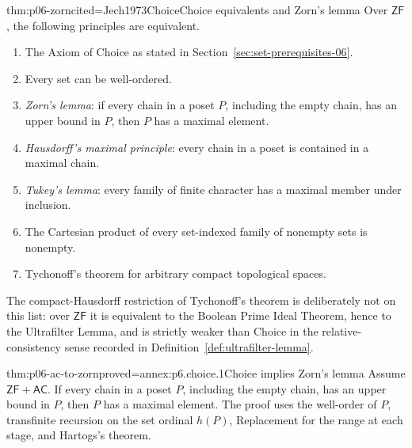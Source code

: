\begin{hbtheorem}{thm:p06-zorn}{cited=Jech1973Choice}{Choice equivalents and Zorn's lemma}
Over \(\mathsf{ZF}\), the following principles are equivalent.
\begin{enumerate}
  \item The Axiom of Choice as stated in
        Section~\ref{sec:set-prerequisites-06}.
  \item Every set can be well-ordered.
  \item \emph{Zorn's lemma}: if every chain in a poset \(P\), including the
        empty chain, has an upper bound in \(P\), then \(P\) has a maximal
        element.
  \item \emph{Hausdorff's maximal principle}: every chain in a poset is
        contained in a maximal chain.
  \item \emph{Tukey's lemma}: every family of finite character has a maximal
        member under inclusion.
  \item The Cartesian product of every set-indexed family of nonempty sets is
        nonempty.
  \item Tychonoff's theorem for arbitrary compact topological spaces.
\end{enumerate}
The compact-Hausdorff restriction of Tychonoff's theorem is deliberately not
on this list: over \(\mathsf{ZF}\) it is equivalent to the Boolean Prime Ideal
Theorem, hence to the Ultrafilter Lemma, and is strictly weaker than Choice in
the relative-consistency sense recorded in
Definition~\ref{def:ultrafilter-lemma}.
\end{hbtheorem}

\begin{hbtheorem}{thm:p06-ac-to-zorn}{proved=annex:p6.choice.1}{Choice implies Zorn's lemma}
Assume \(\mathsf{ZF}+\mathsf{AC}\).  If every chain in a poset \(P\),
including the empty chain, has an upper bound in \(P\), then \(P\) has a
maximal element.  The proof uses the well-order of \(P\), transfinite
recursion on the set ordinal \(h(P)\), Replacement for the range at each
stage, and Hartogs's theorem.
\end{hbtheorem}

